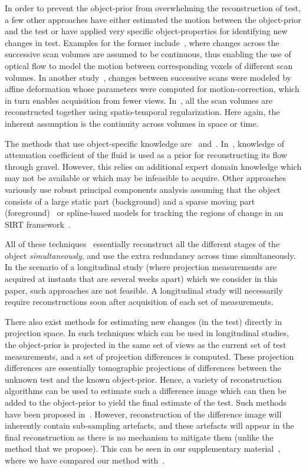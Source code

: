 \documentclass[journal]{IEEEtran}
\begin{document}
In order to prevent the object-prior from overwhelming the
reconstruction of test, a few other approaches have either estimated
the motion between the object-prior and the test or have applied very
specific object-properties for identifying new changes in test.
Examples for the former include~\cite{koen2020}, where changes across
the successive scan volumes are assumed to be continuous, thus
enabling the use of optical flow to model the motion between
corresponding voxels of different scan volumes. In another
study~\cite{vincent2017}, changes between successive scans were
modeled by affine deformation whose parameters were computed for
motion-correction, which in turn enables acquisition from fewer
views. In~\cite{daniil2015}, all the scan volumes are reconstructed
together using spatio-temporal regularization. Here again, the
inherent assumption is the continuity across volumes in space or time.

The methods that use object-specific knowledge are~\cite{Van2015}
and~\cite{Marjolein2016}.  In~\cite{Van2015}, knowledge of attenuation
coefficient of the fluid is used as a prior for reconstructing its
flow through gravel. However, this relies on additional expert domain
knowledge which may not be available or which may be infeasible to
acquire. Other approaches variously use robust principal components
analysis assuming that the object consists of a large static part
(background) and a sparse moving part (foreground)~\cite{HaoGao} or
spline-based models for tracking the regions of change in an SIRT
framework~\cite{Van2014}.

All of these
techniques~\cite{daniil2015,koen2020,Van2015,HaoGao,Van2014}
essentially reconstruct all the different stages of the object
\textit{simultaneously}, and use the extra redundancy across time
simultaneously. In the scenario of a longitudinal study (where
projection measurements are acquired at instants that are several
weeks apart) which we consider in this paper, such approaches are not
feasible. A longitudinal study will necessarily require
reconstructions soon after acquisition of each set of measurements.

There also exist methods for estimating new changes (in the test)
directly in projection space. In such techniques which can be used in
longitudinal studies, the object-prior is projected in the same set of
views as the current set of test measurements, and a set of projection
differences is computed. These projection differences are essentially
tomographic projections of differences between the unknown test and
the known object-prior. Hence, a variety of reconstruction algorithms
can be used to estimate such a difference image which can then be
added to the object-prior to yield the final estimate of the
test. Such methods have been proposed
in~\cite{Pourmorteza2015,Lee2012}. However, reconstruction of the
difference image will inherently contain sub-sampling artefacts, and
these artefacts will appear in the final reconstruction as there is no
mechanism to mitigate them (unlike the method that we propose). This
can be seen in our supplementary material~\cite{supp_paper},
where we have compared our method with~\cite{Lee2012}.
\end{document}
